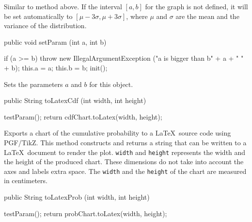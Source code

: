 \begin{tabb}
 Similar to method  above. 
 If the interval $[a,b]$ for the graph is
 not defined, it will be  set automatically to $[\mu - 3\sigma, \mu + 3\sigma]$,
 where $\mu$ and $\sigma$ are the mean and the variance of the distribution.
\end{tabb}
\begin{htmlonly}
\end{htmlonly}
\begin{code}

   public void setParam (int a, int b) \begin{hide} {
      if (a >= b) throw new IllegalArgumentException
            ("a is bigger than b" + a + "  " + b);
      this.a = a;
      this.b = b;
      init();
   }\end{hide}
\end{code}
\begin{tabb}
   Sets the parameters $a$ and $b$ for this object.
\end{tabb}
\begin{htmlonly}
\end{htmlonly}
\begin{code}

   public String toLatexCdf (int width, int height) \begin{hide} {
      testParam();
      return cdfChart.toLatex(width, height);
   }\end{hide}
\end{code}
\begin{tabb}
   Exports a chart of the cumulative probability to a \LaTeX\ source code using
  PGF/TikZ.
   This method constructs and returns a string that can be written to
   a \LaTeX\ document to render the plot. \texttt{width} and \texttt{height}
   represents the width and the height of the produced chart. These dimensions
   do not take into account the axes and labels extra space. The \texttt{width}
   and the \texttt{height} of the chart are measured in centimeters.
\end{tabb}
\begin{htmlonly}
\end{htmlonly}
\begin{code}

   public String toLatexProb (int width, int height) \begin{hide} {
      testParam();
      return probChart.toLatex(width, height);
   }\end{hide}
\end{code}
